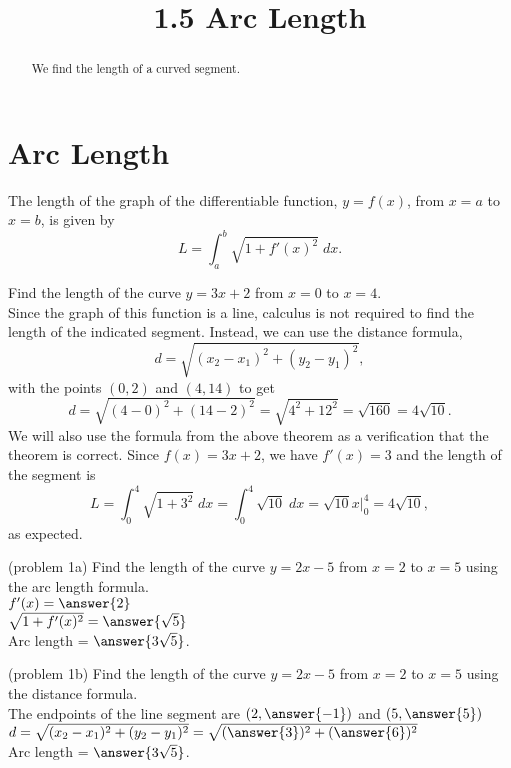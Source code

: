\documentclass[handout]{ximera}
\title{1.5 Arc Length}
\begin{document}
\begin{abstract}
We find the length of a curved segment.
\end{abstract}

\maketitle

\section{Arc Length}

\begin{theorem} The length of the graph of the differentiable function, $y = f(x)$, from $x = a$ to $x = b$, is given by
\[
L = \int_a^b \sqrt{1+ f'(x)^2} \; dx.
\]
\end{theorem}

\begin{example}[example 1]
Find the length of the curve $y = 3x + 2$ from $x = 0$ to $x = 4$. \\
Since the graph of this function is a line, calculus is not required to find the length of the indicated segment.
Instead, we can use the distance formula, 
\[
d = \sqrt{(x_2 - x_1)^2 + (y_2-y_1)^2},
\]
 with the points $(0,2)$ and $(4, 14)$
to get 
\[
d = \sqrt{(4-0)^2 + (14-2)^2} = \sqrt{4^2 + 12^2} = \sqrt{160} = 4\sqrt{10}.
\]
We will also use the formula from the above theorem as a verification that the theorem is correct.
Since $f(x) = 3x+2$, we have $f'(x) = 3$ and the length of the segment is
\[
L = \int_0^4 \sqrt{1 + 3^2} \;dx = \int_0^4 \sqrt{10} \; dx = \sqrt{10}x\bigg|_0^4 = 4\sqrt{10},
\]
as expected.
\end{example}



\begin{problem}(problem 1a)
Find the length of the curve $ y = 2x - 5$ from $x = 2$ to $x = 5$ using the arc length formula.\\

$f'(x) = \answer{2}$\\

$\sqrt{1+f'(x)^2} = \answer{\sqrt{5}}$\\

Arc length = $\answer{3\sqrt{5}}$.
\end{problem}



\begin{problem}(problem 1b)
Find the length of the curve $y = 2x - 5$ from $x = 2$ to $x = 5$ using the distance formula.\\

The endpoints of the line segment are $(2, \answer{-1})$ and $(5, \answer{5})$\\

$d = \sqrt{(x_2 - x_1)^2 + (y_2 - y_1)^2} = \sqrt{(\answer{3})^2 + (\answer{6})^2}$\\

Arc length = $\answer{3\sqrt{5}}$.
\end{problem}
\end{document}

